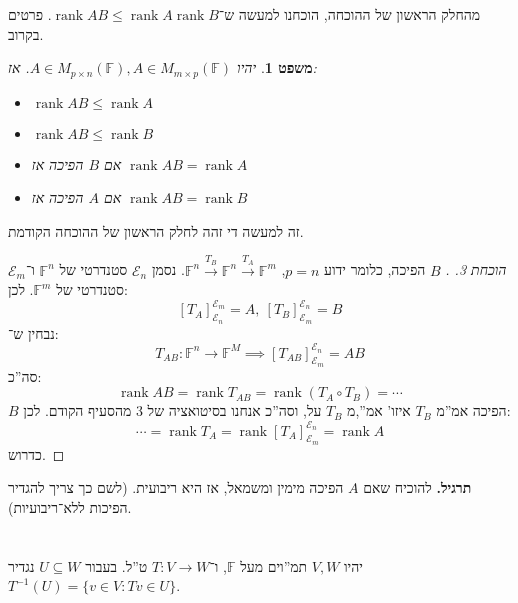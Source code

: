 \documentclass[]{article}
\newcommand\ec    {\mathcal{E}}
\DeclareMathOperator{\rk}     {rank}
\newcommand\F         {\mathbb{F}}
\newcommand\co        {\colon}
\newcommand\op    {^{-1}}
\newtheorem{Theorem}{משפט}
\theoremstyle{definition}
\newcommand\theo  [1] {\begin{Theorem}#1\end{Theorem}}
\begin{document}
	מהחלק הראשון של ההוכחה, הוכחנו למעשה ש־$\rk AB \le \rk A \rk B$. פרטים בקרוב. 
	\theo{יהיו $A \in M_{p \times n}(\F), A \in M_{m \times p}(\F)$. אז: 
	\begin{itemize}
		\item $\rk AB \le \rk A$
		\item $\rk AB \le \rk B$ 
		\item אם $B$ הפיכה אז $\rk AB = \rk A$
		\item אם $A$ הפיכה אז $\rk AB = \rk B$
	\end{itemize}}
	זה למעשה די זהה לחלק הראשון של ההוכחה הקודמת. 
	\begin{proof}[הוכחת 3. ]$B$ הפיכה, כלומר
		ידוע $p = n$, $\F^n \overset{T_B}{\to} \F^n \overset{T_A}{\to}\F^m$. נסמן $\ec_n$ סטנדרטי של $\F^n$ ו־$\ec_m$ סטנדרטי של $\F^m$. לכן: 
		\[ [T_A]^{\ec_m}_{\ec_n} = A, \ [T_B]^{\ec_n}_{\ec_m} = B \]
		נבחין ש־: 
		\[ T_{AB} \co \F^n \to \F^M \implies [T_{AB}]^{\ec_n}_{\ec_m} = AB \]
		סה''כ: 
		\[ \rk AB = \rk T_{AB} = \rk (T_A \circ T_B) = \cdots \]
		$B$ הפיכה אמ''מ $T_B$ איזו' אמ'',מ $T_B$ על, וסה''כ אנחנו בסיטואציה של 3 מהסעיף הקודם. לכן: 
		\[ \cdots = \rk T_A = \rk [T_A]^{\ec_n}_{\ec_m} = \rk A \]
		כדרוש. 
	\end{proof}
	
	\textbf{תרגיל. }להוכיח שאם $A$ הפיכה מימין ומשמאל, אז היא ריבועית. (לשם כך צריך להגדיר הפיכות ללא־ריבועיות). 
	
	\section{}
	יהיו $V, W$ תמ''וים מעל $\F$, ו־$T \co V \to W$ ט''ל. בעבור $U \subseteq W$ נגדיר $T\op(U) = \{v \in V \co Tv \in U\}$. 
	
\end{document}
